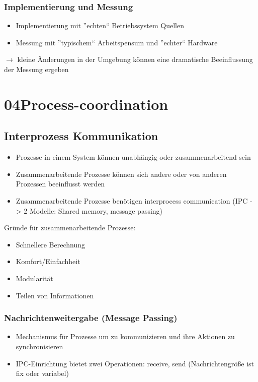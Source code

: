 \documentclass[a4paper]{scrreprt}
\begin{document}
\subsection{Implementierung und Messung}
\begin{itemize}
\item Implementierung mit ''echten`` Betriebssystem Quellen
\item Messung mit ''typischem`` Arbeitspensum und ''echter`` Hardware
\end{itemize}
$\rightarrow$ kleine Änderungen in der Umgebung können eine dramatische Beeinflussung der Messung ergeben
\chapter{04Process-coordination}

\section{Interprozess Kommunikation}
	\begin{itemize}
		\item Prozesse in einem System können unabhängig oder zusammenarbeitend sein
		\item Zusammenarbeitende Prozesse können sich andere oder von anderen Prozessen beeinflusst werden
		\item Zusammenarbeitende Prozesse benötigen interprocess communication (IPC -> 2 Modelle: Shared memory, message passing)
	\end{itemize}
	Gründe für zusammenarbeitende Prozesse:
	\begin{itemize}
		\item Schnellere Berechnung
		\item Komfort/Einfachheit
		\item Modularität
		\item Teilen von Informationen
	\end{itemize}

\subsection{Nachrichtenweitergabe (Message Passing)}
	\begin{itemize}
		\item Mechanismus für Prozesse um zu kommunizieren und ihre Aktionen zu synchronisieren
		\item IPC-Einrichtung bietet zwei Operationen: receive, send (Nachrichtengröße ist fix oder variabel)
	\end{itemize}
\end{document}

